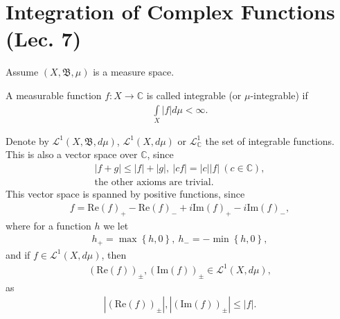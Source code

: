 \section{Integration of Complex Functions (Lec. 7)}
Assume \((X, \mathfrak{B}, \mu)\) is a measure space.
\begin{definition}
    A measurable function \(f:X\rightarrow \mathbb{C}\) is called integrable (or $\mu$-integrable) if
    \begin{align*}
        \int\limits_{X}|f|d\mu < \infty.
    \end{align*}
\end{definition}
Denote by \(\mathcal{L}^1(X, \mathfrak{B}, d\mu)\), \(\mathcal{L}^1(X, d\mu)\) or \(\mathcal{L}_{\mathbb{C}}^{1}\) the set of integrable
functions. This is also a vector space over $\mathbb{C}$, since
\begin{align*}
    |f + g| \leq |f| + |g|, \ |cf| = |c||f| \ (c\in \mathbb{C}), \\
    \text{the other axioms are trivial}.
\end{align*}
This vector space is spanned by positive functions, since
\begin{align*}
    f = \text{Re}(f)_{+} - \text{Re}(f)_{-} + i\text{Im}(f)_{+} - i\text{Im}(f)_{-},
\end{align*}
where for a function $h$ we let
\begin{align*}
    h_{+} = \max\left\{h,0\right\}, \ h_{-} = -\min\left\{ h,0 \right\},
\end{align*}
and if \(f\in \mathcal{L}^{1}(X, d\mu)\), then
\begin{align*}
    (\text{Re}(f))_{\pm}, (\text{Im}(f))_{\pm} \in \mathcal{L}^{1}(X, d\mu),
\end{align*}
as
\begin{align*}
    |(\text{Re}(f))_{\pm}|, |(\text{Im}(f))_{\pm}| \leq |f|.
\end{align*}

